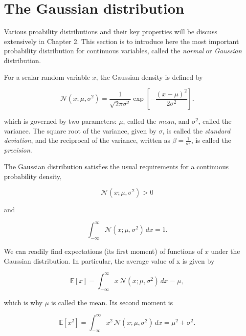 \documentclass[10pt,twocolumn]{memoir}
\begin{document}
\section{The Gaussian distribution}

Various proability distributions and their key properties will be discuss extensively in Chapter 2. This section is to introduce here the most important probability distribution for continuous variables, called the \textit{normal} or \textit{Gaussian} distribution.

For a scalar random variable $x$, the Gaussian density is defined by

\begin{equation}
    \mathcal{N}(x;\mu,\sigma^2) = \frac{1}{\sqrt{2\pi\sigma^2}}\exp\left[-\frac{(x-\mu)^2}{2\sigma^2}\right].
\label{eq:c1_single_gaussian}
\end{equation}

which is governed by two parameters: $\mu$, called the \textit{mean}, and $\sigma^2$, called the variance. The square root of the variance, given by $\sigma$, is called the \textit{standard deviation}, and the reciprocal of the variance, written as $\beta = \frac{1}{\sigma^2}$, is called the \textit{precision}.

The Gaussian distribution satisfies the usual requirements for a continuous probability density,

\begin{equation}
    \mathcal{N}(x;\mu,\sigma^2) > 0
\end{equation}

and

\begin{equation}
    \int_{-\infty}^{\infty}\mathcal{N}(x;\mu,\sigma^2)\,dx = 1.
\end{equation}

We can readily ﬁnd expectations (its first moment) of functions of $x$ under the Gaussian distribution. In particular, the average value of x is given by

\begin{equation}
    \mathbb{E}[x] = \int_{-\infty}^{\infty}x\,\mathcal{N}(x; \mu,\sigma^2)\,dx = \mu,
\end{equation}

which is why $\mu$ is called the mean. Its second moment is

\begin{equation}
    \mathbb{E}[x^2] = \int_{-\infty}^{\infty}x^2\,\mathcal{N}(x;\mu,\sigma^2)\,dx = \mu^2+\sigma^2.
\end{equation}
\end{document}
